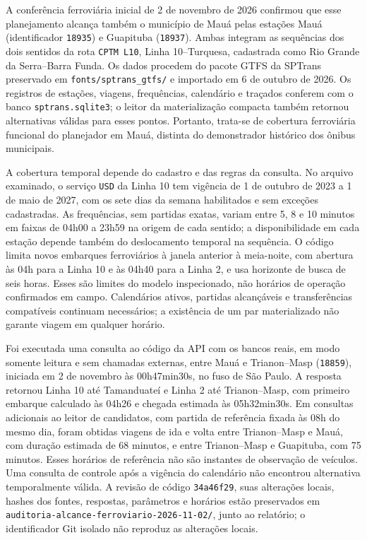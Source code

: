 A conferência ferroviária inicial de 2 de novembro de 2026 confirmou que esse planejamento alcança também o município de Mauá pelas estações Mauá (identificador \texttt{18935}) e Guapituba (\texttt{18937}). Ambas integram as sequências dos dois sentidos da rota \texttt{CPTM L10}, Linha 10--Turquesa, cadastrada como Rio Grande da Serra--Barra Funda. Os dados procedem do pacote GTFS da SPTrans preservado em \nolinkurl{fonts/sptrans_gtfs/} e importado em 6 de outubro de 2026. Os registros de estações, viagens, frequências, calendário e traçados conferem com o banco \nolinkurl{sptrans.sqlite3}; o leitor da materialização compacta também retornou alternativas válidas para esses pontos. Portanto, trata-se de cobertura ferroviária funcional do planejador em Mauá, distinta do demonstrador histórico dos ônibus municipais.

A cobertura temporal depende do cadastro e das regras da consulta. No arquivo examinado, o serviço \texttt{USD} da Linha 10 tem vigência de 1 de outubro de 2023 a 1 de maio de 2027, com os sete dias da semana habilitados e sem exceções cadastradas. As frequências, sem partidas exatas, variam entre 5, 8 e 10 minutos em faixas de 04h00 a 23h59 na origem de cada sentido; a disponibilidade em cada estação depende também do deslocamento temporal na sequência. O código limita novos embarques ferroviários à janela anterior à meia-noite, com abertura às 04h para a Linha 10 e às 04h40 para a Linha 2, e usa horizonte de busca de seis horas. Esses são limites do modelo inspecionado, não horários de operação confirmados em campo. Calendários ativos, partidas alcançáveis e transferências compatíveis continuam necessários; a existência de um par materializado não garante viagem em qualquer horário.

Foi executada uma consulta ao código da API com os bancos reais, em modo somente leitura e sem chamadas externas, entre Mauá e Trianon--Masp (\texttt{18859}), iniciada em 2 de novembro às 00h47min30s, no fuso de São Paulo. A resposta retornou Linha 10 até Tamanduateí e Linha 2 até Trianon--Masp, com primeiro embarque calculado às 04h26 e chegada estimada às 05h32min30s. Em consultas adicionais ao leitor de candidatos, com partida de referência fixada às 08h do mesmo dia, foram obtidas viagens de ida e volta entre Trianon--Masp e Mauá, com duração estimada de 68 minutos, e entre Trianon--Masp e Guapituba, com 75 minutos. Esses horários de referência não são instantes de observação de veículos. Uma consulta de controle após a vigência do calendário não encontrou alternativa temporalmente válida. A revisão de código \texttt{34a46f29}, suas alterações locais, hashes dos fontes, respostas, parâmetros e horários estão preservados em \nolinkurl{auditoria-alcance-ferroviario-2026-11-02/}, junto ao relatório; o identificador Git isolado não reproduz as alterações locais.

